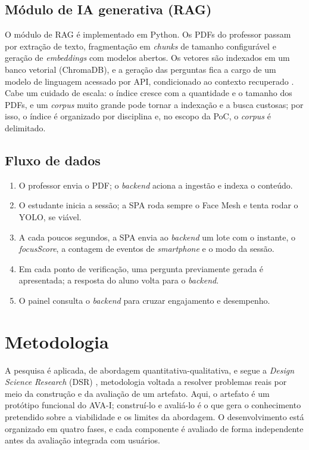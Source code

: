\documentclass[12pt,a4paper]{article}
\begin{document}
\subsection{Módulo de IA generativa (RAG)}

O módulo de RAG é implementado em Python. Os PDFs do professor passam por extração de texto, fragmentação em \emph{chunks} de tamanho configurável e geração de \emph{embeddings} com modelos abertos. Os vetores são indexados em um banco vetorial (ChromaDB), e a geração das perguntas fica a cargo de um modelo de linguagem acessado por API, condicionado ao contexto recuperado \cite{LPP20,GXG23}. Cabe um cuidado de escala: o índice cresce com a quantidade e o tamanho dos PDFs, e um \emph{corpus} muito grande pode tornar a indexação e a busca custosas; por isso, o índice é organizado por disciplina e, no escopo da PoC, o \emph{corpus} é delimitado.

\subsection{Fluxo de dados}

\begin{enumerate}[leftmargin=*]
  \item O professor envia o PDF; o \emph{backend} aciona a ingestão e indexa o conteúdo.
  \item O estudante inicia a sessão; a SPA roda sempre o Face Mesh e tenta rodar o YOLO, se viável.
  \item A cada poucos segundos, a SPA envia ao \emph{backend} um lote com o instante, o \emph{focusScore}, a contagem de eventos de \emph{smartphone} e o modo da sessão.
  \item Em cada ponto de verificação, uma pergunta previamente gerada é apresentada; a resposta do aluno volta para o \emph{backend}.
  \item O painel consulta o \emph{backend} para cruzar engajamento e desempenho.
\end{enumerate}

\section{Metodologia}\label{sec:met}

A pesquisa é aplicada, de abordagem quantitativa-qualitativa, e segue a \emph{Design Science Research} (DSR) \cite{HMPR04}, metodologia voltada a resolver problemas reais por meio da construção e da avaliação de um artefato. Aqui, o artefato é um protótipo funcional do AVA-I; construí-lo e avaliá-lo é o que gera o conhecimento pretendido sobre a viabilidade e os limites da abordagem. O desenvolvimento está organizado em quatro fases, e cada componente é avaliado de forma independente antes da avaliação integrada com usuários.
\end{document}
